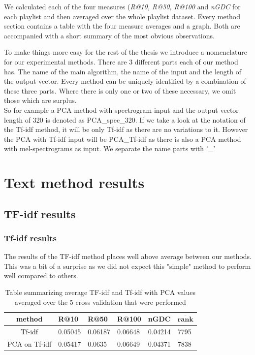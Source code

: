 We calculated each of the four measures (\textit{R@10, R@50, R@100} and \textit{nGDC} for each playlist and then averaged over the whole playlist dataset. Every method section contains a table with the four measure averages and a graph. Both are accompanied with a short summary of the most obvious observations.

To make things more easy for the rest of the thesis we introduce a nomenclature for our experimental methods. There are 3 different parts each of our method has. The name of the main algorithm, the name of the input and the length of the output vector. Every method can be uniquely identified by a combination of these three parts. Where there is only one or two of these necessary, we omit those which are surplus.\\
So for example a PCA method with spectrogram input and the output vector length of 320 is denoted as PCA\_spec\_320. If we take a look at the notation of the Tf-idf method, it will be only Tf-idf as there are no variations to it. However the PCA with Tf-idf input will be PCA\_Tf-idf as there is also a PCA method with mel-spectrograms as input. We separate the name parts with '\_' 

\section{Text method results}

\subsection{TF-idf results}

\subsubsection{Tf-idf results}

The results of the TF-idf method places well above average between our methods. This was a bit of a surprise as we did not expect this "simple" method to perform well compared to others. \\

\begin{table}[h]
\centering
\renewcommand{\arraystretch}{1.5}
\begin{tabu} to 1\textwidth {| c || X[c] | X[c] | X[c] | X[c] | X[c] | }
 \hline
 \textbf{method} & \textbf{R@10} & \textbf{R@50} & \textbf{R@100} & \textbf{nGDC} & $ \boldsymbol{\overline{rank}} $ \\
 \hline
 \hline
 Tf-idf & 0.05045 & 0.06187 & 0.06648 & 0.04214 & 7795 \\
 \hline
 PCA on Tf-idf & 0.05417 & 0.0635 & 0.06649 & 0.04371 & 7838 \\
 \hline
\end{tabu} \\
\caption{Table summarizing average TF-idf and Tf-idf with PCA values averaged over the 5 cross validation that were performed}
\label{table:1}
\end{table}

